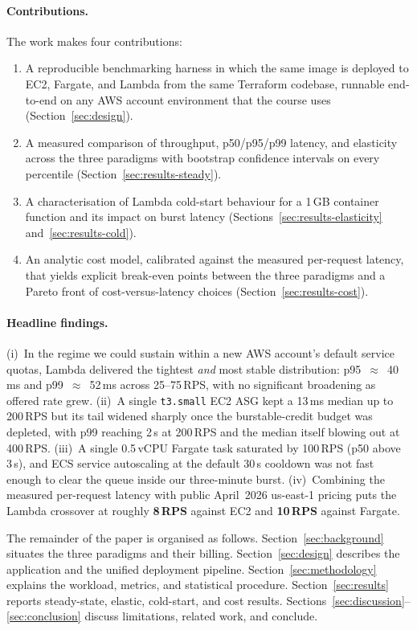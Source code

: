\paragraph{Contributions.} The work makes four contributions:
\begin{enumerate}[leftmargin=*,topsep=2pt,itemsep=2pt]
  \item A reproducible benchmarking harness in which the same image is
        deployed to EC2, Fargate, and Lambda from the same Terraform
        codebase, runnable end-to-end on any AWS account
        environment that the course uses (Section~\ref{sec:design}).
  \item A measured comparison of throughput, p50/p95/p99 latency, and
        elasticity across the three paradigms with bootstrap confidence
        intervals on every percentile (Section~\ref{sec:results-steady}).
  \item A characterisation of Lambda cold-start behaviour for a 1\,GB
        container function and its impact on burst latency
        (Sections~\ref{sec:results-elasticity} and~\ref{sec:results-cold}).
  \item An analytic cost model, calibrated against the measured
        per-request latency, that yields explicit break-even points
        between the three paradigms and a Pareto front of
        cost-versus-latency choices (Section~\ref{sec:results-cost}).
\end{enumerate}

\paragraph{Headline findings.} (i)~In the regime we could sustain
within a new AWS account's default service quotas, Lambda delivered
the tightest \emph{and} most stable distribution: p95~$\approx$~40\,ms
and p99~$\approx$~52\,ms across 25--75\,RPS, with no significant
broadening as offered rate grew. (ii)~A single \texttt{t3.small} EC2
ASG kept a 13\,ms median up to 200\,RPS but its tail widened sharply
once the burstable-credit budget was depleted, with p99 reaching 2\,s
at 200\,RPS and the median itself blowing out at 400\,RPS. (iii)~A
single 0.5\,vCPU Fargate task saturated by 100\,RPS (p50 above 3\,s),
and ECS service autoscaling at the default 30\,s cooldown was not
fast enough to clear the queue inside our three-minute burst.
(iv)~Combining the measured per-request latency with public April~2026
us-east-1 pricing puts the Lambda crossover at roughly \textbf{8\,RPS}
against EC2 and \textbf{10\,RPS} against Fargate.

The remainder of the paper is organised as follows.
Section~\ref{sec:background} situates the three paradigms and their billing.
Section~\ref{sec:design} describes the application and the unified deployment
pipeline. Section~\ref{sec:methodology} explains the workload, metrics, and
statistical procedure. Section~\ref{sec:results} reports steady-state,
elastic, cold-start, and cost results.
Sections~\ref{sec:discussion}--\ref{sec:conclusion} discuss
limitations, related work, and conclude.
